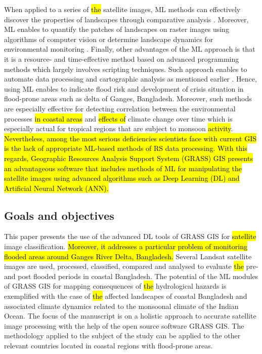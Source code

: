 \documentclass[water,article,submit,pdftex,moreauthors]{Definitions/mdpi}
\begin{document}
When applied to a series of \hl{the }satellite images, ML methods can effectively discover the properties of landscapes through comparative analysis \cite{9324433,Lemenkova202313}. Moreover, ML enables to quantify the patches of landscapes on raster images using algorithms of computer vision  \cite{10281789,jmse11040871,8899013,Lemenkova202021,9333522} or determine landscape dynamics for environmental monitoring \cite{9392684,Lemenkova202324}. Finally, other advantages of the ML approach is that it is a resource- and time-effective method based on advanced programming methods which largely involves scripting techniques. Such approach enables to automate data processing and cartographic analysis as mentioned earlier \cite{10282693,Lemenkova202301,10441504}. Hence, using ML enables to indicate flood risk and development of crisis situation in flood-prone areas such as delta of Ganges, Bangladesh. Moreover, such methods are especially effective for detecting correlation between the environmental processes \hl{in coastal areas }and \hl{effects of }climate change over time which is especially actual for tropical regions that are subject to monsoon \hl{activity}. \hl{Nevertheless, among the most serious deficiencies scientists face with current GIS is the lack of appropriate ML-based methods of RS data processing. With this regards, Geographic Resources Analysis Support System (GRASS) GIS presents an advantageous software that includes methods of ML for manipulating the satellite images using advanced algorithms such as Deep Learning (DL) and Artificial Neural Network (ANN).}

\subsection{Goals and objectives}

This paper presents the use of the advanced DL tools of GRASS GIS for \hl{satellite }image classification. \hl{Moreover, it addresses a particular problem of monitoring flooded areas around Ganges River Delta, Bangladesh.} Several Landsat satellite images are used, processed, classified, compared and analysed to evaluate \hl{the }pre-and post flooded periods in coastal Bangladesh. The potential of the ML modules of GRASS GIS for mapping consequences of \hl{the }hydrological hazards is exemplified with the case of \hl{the }affected landscapes of coastal Bangladesh and associated climate dynamics related to the monsoonal climate of the Indian Ocean. The focus of the manuscript is on a holistic approach to accurate satellite image processing with the help of the open source software GRASS GIS. The methodology applied to the subject of the study can be applied to the other relevant countries located in coastal regions with flood-prone areas.
\end{document}
